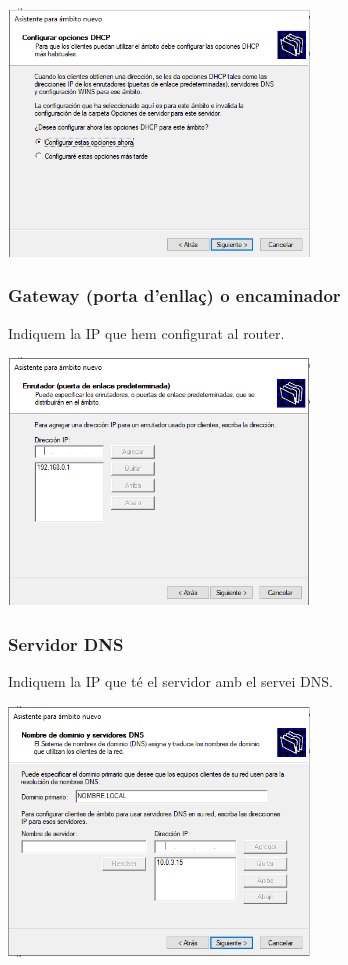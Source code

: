 \documentclass[
  a4paper,
]{article}
\begin{document}
\includegraphics[width=0.6\textwidth,height=\textheight]{png/DHCP11.png}

\subsubsection{Gateway (porta d'enllaç) o
encaminador}\label{gateway-porta-denllauxe7-o-encaminador}

Indiquem la IP que hem configurat al router.

\includegraphics[width=0.6\textwidth,height=\textheight]{png/DHCP12.png}

\subsubsection{Servidor DNS}\label{servidor-dns}

Indiquem la IP que té el servidor amb el servei DNS.

\includegraphics[width=0.6\textwidth,height=\textheight]{png/DHCP13.png}
\end{document}
